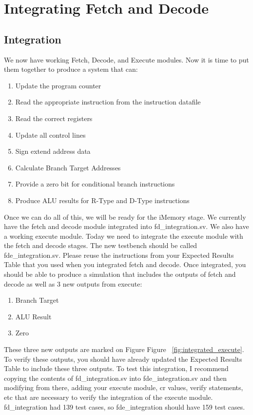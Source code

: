 \chapter{Integrating Fetch and Decode}

\section{Integration}
We now have working Fetch, Decode, and Execute modules.  Now it is time to put them together to produce a system that can:
\begin{enumerate}
	\item Update the program counter
	\item Read the appropriate instruction from the instruction datafile
	\item Read the correct registers
	\item Update all control lines
	\item Sign extend address data
	\item Calculate Branch Target Addresses
	\item Provide a zero bit for conditional branch instructions
	\item Produce ALU results for R-Type and D-Type instructions
\end{enumerate}

Once we can do all of this, we will be ready for the iMemory stage.  We currently have the fetch and decode module integrated into fd\_integration.sv.  We also have a working execute module.  Today we need to integrate the execute module with the fetch and decode stages.  The new testbench should be called fde\_integration.sv.  Please reuse the instructions from your Expected Results Table that you used when you integrated fetch and decode.  Once integrated, you should be able to produce a simulation that includes the outputs of fetch and decode as well as 3 new outputs from execute:
\begin{enumerate}
	\item Branch Target
	\item ALU Result
	\item Zero
\end{enumerate}   

These three new outputs are marked on Figure Figure ~\ref{fig:integrated_execute}.  To verify these outputs, you should have already  updated the Expected Results Table to include these three outputs.  To test this integration, I recommend copying the contents of fd\_integration.sv into fde\_integration.sv and then modifying from there, adding your execute module, cr values, verify statements, etc that are necessary to verify the integration of the execute module. fd\_integration had 139 test cases, so fde\_integration should have 159 test cases.

